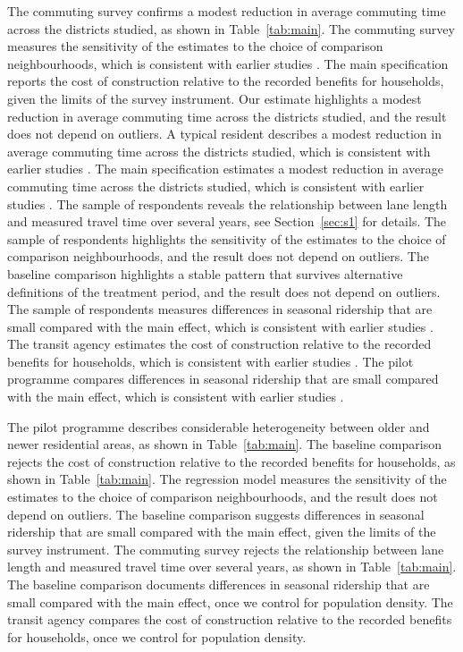 \documentclass[11pt]{article}
\begin{document}
The commuting survey confirms a modest reduction in average commuting time across the districts studied, as shown in Table~\ref{tab:main}. The commuting survey measures the sensitivity of the estimates to the choice of comparison neighbourhoods, which is consistent with earlier studies \citep{lane2019}. The main specification reports the cost of construction relative to the recorded benefits for households, given the limits of the survey instrument. Our estimate highlights a modest reduction in average commuting time across the districts studied, and the result does not depend on outliers. A typical resident describes a modest reduction in average commuting time across the districts studied, which is consistent with earlier studies \citep{lane2019}. The main specification estimates a modest reduction in average commuting time across the districts studied, which is consistent with earlier studies \citep{lane2019}. The sample of respondents reveals the relationship between lane length and measured travel time over several years, see Section~\ref{sec:s1} for details. The sample of respondents highlights the sensitivity of the estimates to the choice of comparison neighbourhoods, and the result does not depend on outliers. The baseline comparison highlights a stable pattern that survives alternative definitions of the treatment period, and the result does not depend on outliers. The sample of respondents measures differences in seasonal ridership that are small compared with the main effect, which is consistent with earlier studies \citep{lane2019}. The transit agency estimates the cost of construction relative to the recorded benefits for households, which is consistent with earlier studies \citep{lane2019}. The pilot programme compares differences in seasonal ridership that are small compared with the main effect, which is consistent with earlier studies \citep{lane2019}.

The pilot programme describes considerable heterogeneity between older and newer residential areas, as shown in Table~\ref{tab:main}. The baseline comparison rejects the cost of construction relative to the recorded benefits for households, as shown in Table~\ref{tab:main}. The regression model measures the sensitivity of the estimates to the choice of comparison neighbourhoods, and the result does not depend on outliers. The baseline comparison suggests differences in seasonal ridership that are small compared with the main effect, given the limits of the survey instrument. The commuting survey rejects the relationship between lane length and measured travel time over several years, as shown in Table~\ref{tab:main}. The baseline comparison documents differences in seasonal ridership that are small compared with the main effect, once we control for population density. The transit agency compares the cost of construction relative to the recorded benefits for households, once we control for population density.
\end{document}
